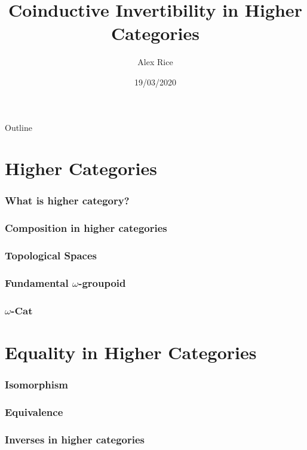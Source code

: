 \documentclass[presentation]{beamer}
\author{Alex Rice}
\date{19/03/2020}
\title{Coinductive Invertibility in Higher Categories}
\begin{document}
\maketitle
\begin{frame}{Outline}
  \tableofcontents
\end{frame}

\section{Higher Categories}

\begin{frame}
  \frametitle{What is higher category?}

\end{frame}

\begin{frame}
  \frametitle{Composition in higher categories}
\end{frame}

\begin{frame}
  \frametitle{Topological Spaces}
\end{frame}

\begin{frame}
  \frametitle{Fundamental \(\omega\)-groupoid}
\end{frame}

\begin{frame}
  \frametitle{\(\omega\)-\(\mathbf{Cat}\)}
\end{frame}

\section{Equality in Higher Categories}

\begin{frame}
  \frametitle{Isomorphism}
\end{frame}

\begin{frame}
  \frametitle{Equivalence}
\end{frame}

\begin{frame}
  \frametitle{Inverses in higher categories}
\end{frame}
\end{document}
